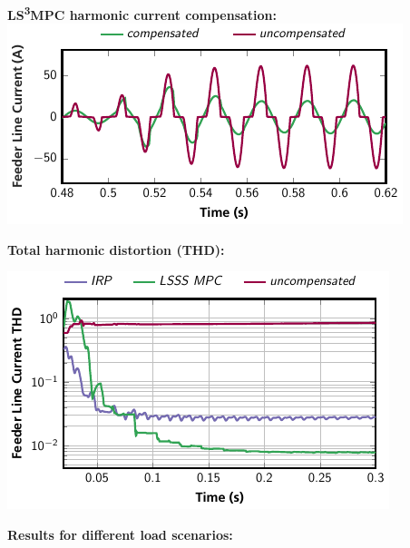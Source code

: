 \documentclass[a0paper,portrait]{baposter}
\begin{document}
\begin{poster}
{\textbf{LS\textsuperscript{3}MPC harmonic current compensation:}
\includegraphics{mpcif_const}

\vspace{-.4em}
\begin{flushleft}
\textbf{Total harmonic distortion (THD):}
\end{flushleft}
\vspace{-.6em}
\includegraphics{thd} \\

\vspace{-1.7em}
\begin{flushleft}
\textbf{Results for different load scenarios:} \end{flushleft}

}
\end{poster}
\end{document}
